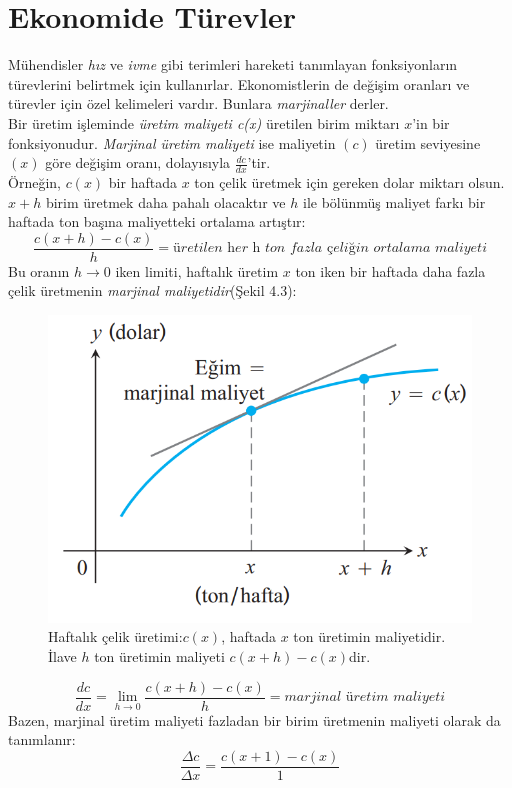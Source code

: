 \section{\protect Ekonomide Türevler} \label{bolumetiketi}
Mühendisler \textit{hız} ve \textit{ivme} gibi terimleri hareketi tanımlayan fonksiyonların türevlerini belirtmek için kullanırlar. Ekonomistlerin de değişim oranları ve türevler için özel kelimeleri vardır. Bunlara \textit{marjinaller} derler.\\
	Bir üretim işleminde \textit{üretim maliyeti c(x)} üretilen birim miktarı $x$'in bir fonksiyonudur. \textit{Marjinal üretim maliyeti} ise maliyetin $(c)$ üretim seviyesine $(x)$ göre değişim oranı, dolayısıyla $\frac{dc}{dx}$'tir.\\
	Örneğin, $c(x)$ bir haftada $x$ ton çelik üretmek için gereken dolar miktarı olsun. $x+h$ birim üretmek daha pahalı olacaktır ve $h$  ile bölünmüş maliyet farkı bir haftada ton başına maliyetteki ortalama artıştır:
	\begin{equation*}
	\frac{c(x+h)-c(x)}{h}=\textit{üretilen her h ton fazla çeliğin ortalama maliyeti}
	\end{equation*}
Bu oranın $h \rightarrow 0$ iken limiti, haftalık üretim $x$ ton iken bir haftada daha fazla çelik üretmenin \textit{marjinal maliyetidir}(Şekil 4.3):
\begin{figure}[H]
	\centering
	\includegraphics[width=0.5\linewidth]{ekonomideturev1.png}
	\caption{Haftalık çelik üretimi:$c(x)$, haftada $x$ ton üretimin maliyetidir. İlave $h$ ton üretimin maliyeti $c(x+h)-c(x)$dir.}
	\label{fig:ornekresim}
\end{figure}
	\begin{equation*}
	\frac{dc}{dx}=\lim_{h \rightarrow 0}\frac{c(x+h)-c(x)}{h}=\textit{marjinal üretim maliyeti}
	\end{equation*}
Bazen, marjinal üretim maliyeti fazladan bir birim üretmenin maliyeti olarak da tanımlanır:
	\begin{equation*}
	\frac{\varDelta c}{\varDelta x}= \frac{c(x+1)-c(x)}{1}
	\end{equation*}
